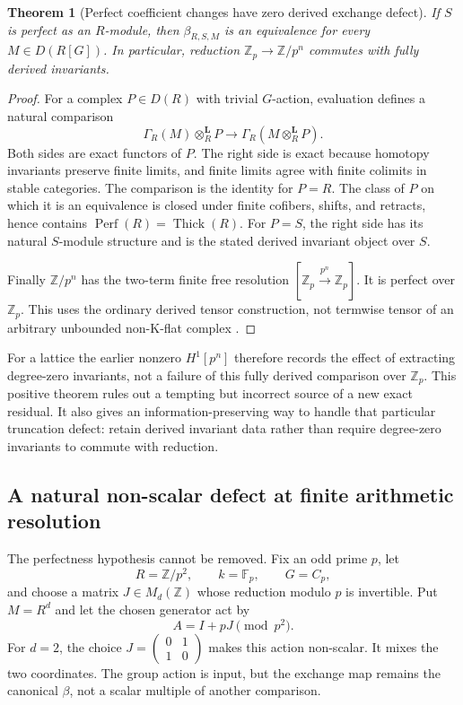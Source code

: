 \documentclass[11pt]{article}
\newtheorem{theorem}{Theorem}[section]
\theoremstyle{definition}
\theoremstyle{remark}
\begin{document}
\begin{theorem}[Perfect coefficient changes have zero derived exchange defect]\label{thm:perfect-invariant-exchange}
If $S$ is perfect as an $R$-module, then $\beta_{R,S,M}$ is an equivalence for every $M\in D(R[G])$. In particular, reduction $\mathbb Z_p\to\mathbb Z/p^n$ commutes with fully derived invariants.
\end{theorem}
\begin{proof}
For a complex $P\in D(R)$ with trivial $G$-action, evaluation defines a natural comparison
\[
 \Gamma_R(M)\otimes_R^{\mathbf L}P
 \longrightarrow\Gamma_R(M\otimes_R^{\mathbf L}P).
\]
Both sides are exact functors of $P$. The right side is exact because homotopy invariants preserve finite limits, and finite limits agree with finite colimits in stable categories. The comparison is the identity for $P=R$. The class of $P$ on which it is an equivalence is closed under finite cofibers, shifts, and retracts, hence contains $\operatorname{Perf}(R)=\operatorname{Thick}(R)$. For $P=S$, the right side has its natural $S$-module structure and is the stated derived invariant object over $S$.

Finally $\mathbb Z/p^n$ has the two-term finite free resolution $[\mathbb Z_p\xrightarrow{p^n}\mathbb Z_p]$. It is perfect over $\mathbb Z_p$. This uses the ordinary derived tensor construction, not termwise tensor of an arbitrary unbounded non-K-flat complex \cite{StacksDerivedTensor}.
\end{proof}

For a lattice the earlier nonzero $H^1[p^n]$ therefore records the effect of extracting degree-zero invariants, not a failure of this fully derived comparison over $\mathbb Z_p$. This positive theorem rules out a tempting but incorrect source of a new exact residual. It also gives an information-preserving way to handle that particular truncation defect: retain derived invariant data rather than require degree-zero invariants to commute with reduction.

\subsection{A natural non-scalar defect at finite arithmetic resolution}

The perfectness hypothesis cannot be removed. Fix an odd prime $p$, let
\[
 R=\mathbb Z/p^2,\qquad k=\mathbb F_p,\qquad G=C_p,
\]
and choose a matrix $J\in M_d(\mathbb Z)$ whose reduction modulo $p$ is invertible. Put $M=R^d$ and let the chosen generator act by
\[
 A=I+pJ\pmod{p^2}.
\]
For $d=2$, the choice $J=\left(\begin{smallmatrix}0&1\\1&0\end{smallmatrix}\right)$ makes this action non-scalar. It mixes the two coordinates. The group action is input, but the exchange map remains the canonical $\beta$, not a scalar multiple of another comparison.
\end{document}
